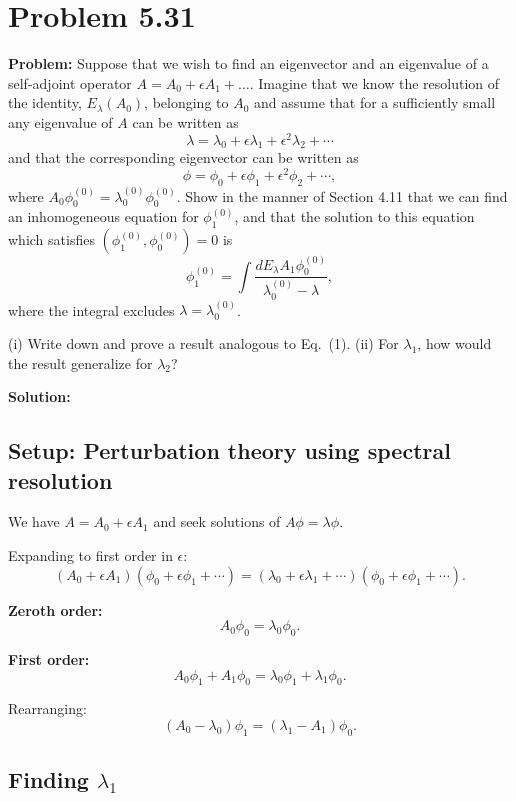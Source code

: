 \documentclass[12pt]{article}
\begin{document}
\section*{Problem 5.31}

\textbf{Problem:} Suppose that we wish to find an eigenvector and an eigenvalue of a self-adjoint operator $A = A_0 + \epsilon A_1 + \ldots$. Imagine that we know the resolution of the identity, $E_\lambda(A_0)$, belonging to $A_0$ and assume that for a sufficiently small any eigenvalue of $A$ can be written as
\[
\lambda = \lambda_0 + \epsilon\lambda_1 + \epsilon^2\lambda_2 + \cdots
\]
and that the corresponding eigenvector can be written as
\[
\phi = \phi_0 + \epsilon\phi_1 + \epsilon^2\phi_2 + \cdots,
\]
where $A_0\phi_0^{(0)} = \lambda_0^{(0)}\phi_0^{(0)}$. Show in the manner of Section 4.11 that we can find an inhomogeneous equation for $\phi_1^{(0)}$, and that the solution to this equation which satisfies $(\phi_1^{(0)}, \phi_0^{(0)}) = 0$ is
\[
\phi_1^{(0)} = \int \frac{dE_\lambda A_1\phi_0^{(0)}}{\lambda_0^{(0)} - \lambda},
\]
where the integral excludes $\lambda = \lambda_0^{(0)}$.

(i) Write down and prove a result analogous to Eq.\ (1). (ii) For $\lambda_1$, how would the result generalize for $\lambda_2$?

\bigskip
\textbf{Solution:}

\subsection*{Setup: Perturbation theory using spectral resolution}

We have $A = A_0 + \epsilon A_1$ and seek solutions of $A\phi = \lambda\phi$.

Expanding to first order in $\epsilon$:
\[
(A_0 + \epsilon A_1)(\phi_0 + \epsilon\phi_1 + \cdots) = (\lambda_0 + \epsilon\lambda_1 + \cdots)(\phi_0 + \epsilon\phi_1 + \cdots).
\]

\textbf{Zeroth order:}
\[
A_0\phi_0 = \lambda_0\phi_0. \tag{0}
\]

\textbf{First order:}
\[
A_0\phi_1 + A_1\phi_0 = \lambda_0\phi_1 + \lambda_1\phi_0. \tag{1}
\]

Rearranging:
\[
(A_0 - \lambda_0)\phi_1 = (\lambda_1 - A_1)\phi_0. \tag{2}
\]

\subsection*{Finding $\lambda_1$}
\end{document}
